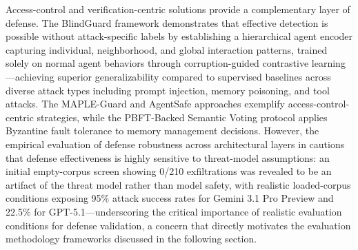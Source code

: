 \documentclass[11pt]{article}
\begin{document}
Access-control and verification-centric solutions provide a complementary layer of defense. The BlindGuard framework \cite{ref440} demonstrates that effective detection is possible without attack-specific labels by establishing a hierarchical agent encoder capturing individual, neighborhood, and global interaction patterns, trained solely on normal agent behaviors through corruption-guided contrastive learning---achieving superior generalizability compared to supervised baselines across diverse attack types including prompt injection, memory poisoning, and tool attacks. The MAPLE-Guard and AgentSafe approaches exemplify access-control-centric strategies, while the PBFT-Backed Semantic Voting protocol \cite{ref435} applies Byzantine fault tolerance to memory management decisions. However, the empirical evaluation of defense robustness across architectural layers in \cite{ref433} cautions that defense effectiveness is highly sensitive to threat-model assumptions: an initial empty-corpus screen showing 0/210 exfiltrations was revealed to be an artifact of the threat model rather than model safety, with realistic loaded-corpus conditions exposing 95\% attack success rates for Gemini 3.1 Pro Preview and 22.5\% for GPT-5.1---underscoring the critical importance of realistic evaluation conditions for defense validation, a concern that directly motivates the evaluation methodology frameworks discussed in the following section.
\end{document}
